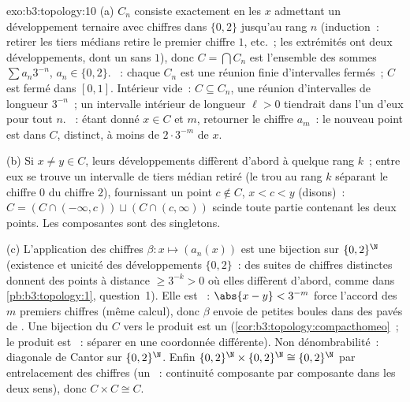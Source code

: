 \begin{solution}{exo:b3:topology:10}
(a) $C_n$ consiste exactement en les $x$ admettant un
développement ternaire avec chiffres dans $\{0, 2\}$ jusqu'au
rang $n$ (induction~: retirer les tiers médians retire le
premier chiffre $1$, etc.~; les extrémités ont deux
développements, dont un sans $1$), donc $C = \bigcap C_n$ est
l'ensemble des sommes $\sum a_n3^{-n}$, $a_n \in \{0,2\}$.
~: chaque $C_n$ est une réunion finie d'intervalles
fermés~; $C$ est fermé dans $[0,1]$. Intérieur vide~: $C
\subseteq C_n$, une réunion d'intervalles de longueur
$3^{-n}$~; un intervalle intérieur de longueur $\ell > 0$
tiendrait dans l'un d'eux pour tout $n$. ~: étant donné
$x \in C$ et $m$, retourner le chiffre $a_m$~: le nouveau
point est dans $C$, distinct, à moins de $2\cdot3^{-m}$ de
$x$.

(b) Si $x \neq y \in C$, leurs développements diffèrent d'abord
à quelque rang $k$~; entre eux se trouve un intervalle de
tiers médian retiré (le trou au rang $k$ séparant le chiffre
$0$ du chiffre $2$), fournissant un point $c \notin C$, $x <
c < y$ (disons)~: $C = (C \cap (-\infty, c)) \sqcup (C \cap
(c, \infty))$ scinde toute partie contenant les deux points.
Les composantes sont des singletons.

(c) L'application des chiffres $\beta\colon x \mapsto
(a_n(x))$ est une bijection sur $\{0,2\}^\N$ (existence et
unicité des développements $\{0,2\}$~: des suites de chiffres
distinctes donnent des points à distance $\geq 3^{-k} > 0$ où
elles diffèrent d'abord, comme dans
\cref{pb:b3:topology:1}, question~1). Elle est ~:
$\abs{x - y} < 3^{-m}$ force l'accord des $m$ premiers
chiffres (même calcul), donc $\beta$ envoie de petites boules
dans des pavés de . Une bijection  du  $C$
vers le produit  est un 
(\cref{cor:b3:topology:compacthomeo}~; le produit est ~:
séparer en une coordonnée différente). Non dénombrabilité~:
diagonale de Cantor sur $\{0,2\}^\N$. Enfin $\{0,2\}^\N
\times \{0,2\}^\N \cong \{0,2\}^\N$ par entrelacement des
chiffres (un ~: continuité composante par
composante dans les deux sens), donc $C \times C \cong C$.
\end{solution}

